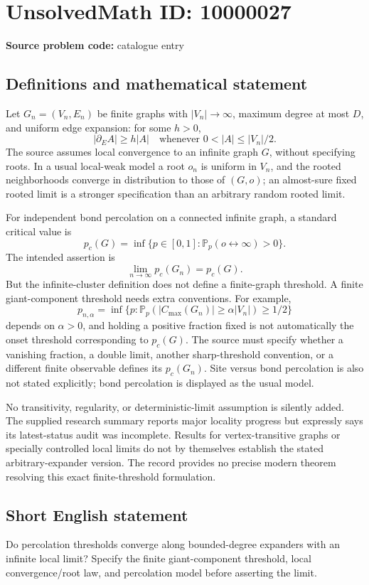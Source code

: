 \documentclass[11pt]{article}
\begin{document}
\section*{UnsolvedMath ID: 10000027}
\textbf{Source problem code:} catalogue entry
\subsection{Definitions and mathematical statement}
Let \(G_n=(V_n,E_n)\) be finite graphs with \(|V_n|\to\infty\), maximum degree at most \(D\), and uniform edge expansion: for some \(h>0\),
\[
|\partial_E A|\ge h|A|
\quad\text{whenever }0<|A|\le|V_n|/2.
\]
The source assumes local convergence to an infinite graph \(G\), without specifying roots. In a usual local-weak model a root \(o_n\) is uniform in \(V_n\), and the rooted neighborhoods converge in distribution to those of \((G,o)\); an almost-sure fixed rooted limit is a stronger specification than an arbitrary random rooted limit.

For independent bond percolation on a connected infinite graph, a standard critical value is
\[
p_c(G)=\inf\{p\in[0,1]:\mathbb P_p(o\leftrightarrow\infty)>0\}.
\]
The intended assertion is
\[
\lim_{n\to\infty}p_c(G_n)=p_c(G).
\]
But the infinite-cluster definition does not define a finite-graph threshold. A finite giant-component threshold needs extra conventions. For example,
\[
p_{n,\alpha}=\inf\{p:\mathbb P_p(|C_{\max}(G_n)|\ge\alpha|V_n|)\ge1/2\}
\]
depends on \(\alpha>0\), and holding a positive fraction fixed is not automatically the onset threshold corresponding to \(p_c(G)\). The source must specify whether a vanishing fraction, a double limit, another sharp-threshold convention, or a different finite observable defines its \(p_c(G_n)\). Site versus bond percolation is also not stated explicitly; bond percolation is displayed as the usual model.

No transitivity, regularity, or deterministic-limit assumption is silently added. The supplied research summary reports major locality progress but expressly says its latest-status audit was incomplete. Results for vertex-transitive graphs or specially controlled local limits do not by themselves establish the stated arbitrary-expander version. The record provides no precise modern theorem resolving this exact finite-threshold formulation.
\subsection{Short English statement}
Do percolation thresholds converge along bounded-degree expanders with an infinite local limit? Specify the finite giant-component threshold, local convergence/root law, and percolation model before asserting the limit.
\end{document}
